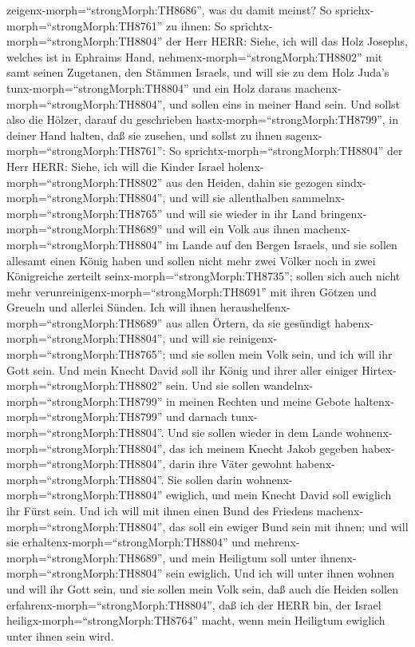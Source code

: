 zeigenx-morph=``strongMorph:TH8686'', was du damit meinst? 
So sprichx-morph=``strongMorph:TH8761'' zu ihnen: So
sprichtx-morph=``strongMorph:TH8804'' der Herr HERR: Siehe, ich will das
Holz Josephs, welches ist in Ephraims Hand,
nehmenx-morph=``strongMorph:TH8802'' mit samt seinen Zugetanen, den
Stämmen Israels, und will sie zu dem Holz Juda's
tunx-morph=``strongMorph:TH8804'' und ein Holz daraus
machenx-morph=``strongMorph:TH8804'', und sollen eins in meiner Hand
sein.  Und sollst also die Hölzer, darauf du geschrieben
hastx-morph=``strongMorph:TH8799'', in deiner Hand halten, daß sie
zusehen,  und sollst zu ihnen
sagenx-morph=``strongMorph:TH8761'': So
sprichtx-morph=``strongMorph:TH8804'' der Herr HERR: Siehe, ich will die
Kinder Israel holenx-morph=``strongMorph:TH8802'' aus den Heiden, dahin
sie gezogen sindx-morph=``strongMorph:TH8804'', und will sie
allenthalben sammelnx-morph=``strongMorph:TH8765'' und will sie wieder
in ihr Land bringenx-morph=``strongMorph:TH8689''  und will
ein Volk aus ihnen machenx-morph=``strongMorph:TH8804'' im Lande auf den
Bergen Israels, und sie sollen allesamt einen König haben und sollen
nicht mehr zwei Völker noch in zwei Königreiche zerteilt
seinx-morph=``strongMorph:TH8735'';  sollen sich auch nicht
mehr verunreinigenx-morph=``strongMorph:TH8691'' mit ihren Götzen und
Greueln und allerlei Sünden. Ich will ihnen
heraushelfenx-morph=``strongMorph:TH8689'' aus allen Örtern, da sie
gesündigt habenx-morph=``strongMorph:TH8804'', und will sie
reinigenx-morph=``strongMorph:TH8765''; und sie sollen mein Volk sein,
und ich will ihr Gott sein.  Und mein Knecht David soll ihr
König und ihrer aller einiger Hirtex-morph=``strongMorph:TH8802'' sein.
Und sie sollen wandelnx-morph=``strongMorph:TH8799'' in meinen Rechten
und meine Gebote haltenx-morph=``strongMorph:TH8799'' und darnach
tunx-morph=``strongMorph:TH8804''.  Und sie sollen wieder
in dem Lande wohnenx-morph=``strongMorph:TH8804'', das ich meinem Knecht
Jakob gegeben habex-morph=``strongMorph:TH8804'', darin ihre Väter
gewohnt habenx-morph=``strongMorph:TH8804''. Sie sollen darin
wohnenx-morph=``strongMorph:TH8804'' ewiglich, und mein Knecht David
soll ewiglich ihr Fürst sein.  Und ich will mit ihnen einen
Bund des Friedens machenx-morph=``strongMorph:TH8804'', das soll ein
ewiger Bund sein mit ihnen; und will sie
erhaltenx-morph=``strongMorph:TH8804'' und
mehrenx-morph=``strongMorph:TH8689'', und mein Heiligtum soll unter
ihnenx-morph=``strongMorph:TH8804'' sein ewiglich.  Und ich
will unter ihnen wohnen und will ihr Gott sein, und sie sollen mein Volk
sein,  daß auch die Heiden sollen
erfahrenx-morph=``strongMorph:TH8804'', daß ich der HERR bin, der Israel
heiligx-morph=``strongMorph:TH8764'' macht, wenn mein Heiligtum ewiglich
unter ihnen sein wird.

